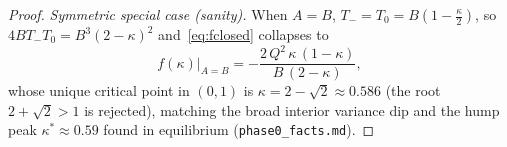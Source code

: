 \begin{proof}
\emph{Symmetric special case (sanity).} When $A=B$, $T_-=T_0=B(1-\tfrac\kappa2)$,
so $4BT_-T_0=B^3(2-\kappa)^2$ and~\eqref{eq:fclosed} collapses to
\[
   f(\kappa)\big|_{A=B}=-\frac{2\,Q^2\,\kappa\,(1-\kappa)}{B\,(2-\kappa)},
\]
whose unique critical point in $(0,1)$ is $\kappa=2-\sqrt2\approx0.586$ (the root
$2+\sqrt2>1$ is rejected), matching the broad interior variance dip and the hump
peak $\kappa^\ast\approx0.59$ found in equilibrium (\texttt{phase0\_facts.md}).
\end{proof}

